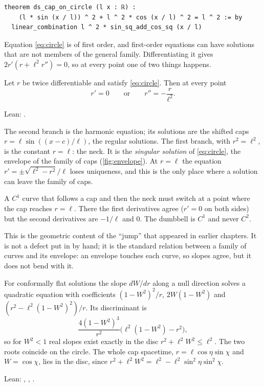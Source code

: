 \begin{leanbox}
\begin{Verbatim}[fontsize=\small]
theorem ds_cap_on_circle (l x : ℝ) :
    (l * sin (x / l)) ^ 2 + l ^ 2 * cos (x / l) ^ 2 = l ^ 2 := by
  linear_combination l ^ 2 * sin_sq_add_cos_sq (x / l)
\end{Verbatim}
\end{leanbox}

Equation \eqref{eq:circle} is of first order, and first-order equations can have solutions that are not members of the general family. Differentiating it gives $2r'(r+\ell^2r'')=0$, so at every point one of two things happens.

\begin{theorem}\proved\label{thm:branch}
Let $r$ be twice differentiable and satisfy \eqref{eq:circle}. Then at every point
\[
r'=0\qquad\text{or}\qquad r''=-\frac{r}{\ell^2}.
\]
\end{theorem}
\noindent Lean: .

The second branch is the harmonic equation; its solutions are the shifted caps $r=\ell\sin((x-c)/\ell)$, the regular solutions. The first branch, with $r^2=\ell^2$, is the constant $r=\ell$: the neck. It is the \emph{singular solution} of \eqref{eq:circle}, the envelope of the family of caps (\cref{fig:envelope}). At $r=\ell$ the equation $r'=\pm\sqrt{\ell^2-r^2}/\ell$ loses uniqueness, and this is the only place where a solution can leave the family of caps.

\begin{corollary}
A $C^1$ curve that follows a cap and then the neck must switch at a point where the cap reaches $r=\ell$. There the first derivatives agree ($r'=0$ on both sides) but the second derivatives are $-1/\ell$ and $0$. The dumbbell is $C^1$ and never $C^2$.
\end{corollary}

This is the geometric content of the ``jump'' that appeared in earlier chapters. It is not a defect put in by hand; it is the standard relation between a family of curves and its envelope: an envelope touches each curve, so slopes agree, but it does not bend with it.

\begin{proposition}\proved\label{prop:disc}
For conformally flat solutions the slope $dW/dr$ along a null direction solves a quadratic equation with coefficients $(1-W^2)^2/r$, $2W(1-W^2)$ and $(r^2-\ell^2(1-W^2)^2)/r$. Its discriminant is
\[
\frac{4(1-W^2)^3}{r^2}\bigl(\ell^2(1-W^2)-r^2\bigr),
\]
so for $W^2<1$ real slopes exist exactly in the disc $r^2+\ell^2W^2\le\ell^2$. The two roots coincide on the circle. The whole cap spacetime, $r=\ell\cos\eta\sin\chi$ and $W=\cos\chi$, lies in the disc, since $r^2+\ell^2W^2=\ell^2-\ell^2\sin^2\eta\sin^2\chi$.
\end{proposition}
\noindent Lean: , , .


